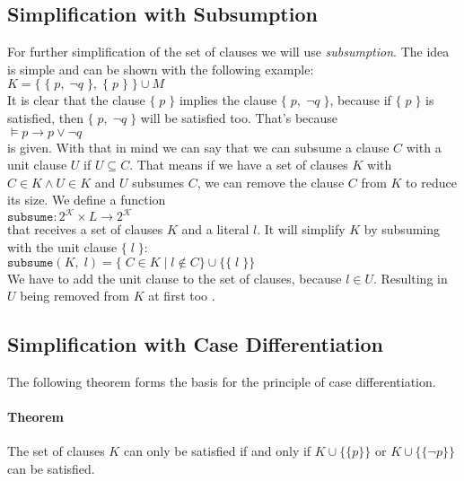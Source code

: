 \subsection{Simplification with Subsumption}
\label{sub:sciDavisPutnamSubsumption}
For further simplification of the set of clauses we will use \emph{subsumption}. The idea is simple and can be shown with the following example:
\\[0.2cm]
\hspace*{1.3cm} $K = \bigl\{\; \{\; p,\; \neg q \;\},\; \{\; p\; \}\;\bigr\} \cup M$
\\[0.2cm]
It is clear that the clause $\{\; p\; \}$ implies the clause $\{\; p,\; \neg q \;\}$, because if $\{\; p\; \}$ is satisfied, then $\{\; p,\; \neg q \;\}$ will be satisfied too. That's because
\\[0.2cm]
\hspace*{1.3cm} $\models p \to p \lor \neg q$
\\[0.2cm]
is given. With that in mind we can say that we can subsume a clause $C$ with a unit clause $U$ if $U \subseteq C$. That means if we have a set of clauses $K$ with $C \in K \land U \in K$ and $U$ subsumes $C$, we can remove the clause $C$ from $K$ to reduce its size. We define a function
\\[0.2cm]
\hspace*{1.3cm} $\texttt{subsume}: 2^{\mathcal{K}} \times L \to 2^{\mathcal{K}}$
\\[0.2cm]
that receives a set of clauses $K$ and a literal $l$. It will simplify $K$ by subsuming with the unit clause $\{\; l\; \}$:
\\[0.2cm]
\hspace*{1.3cm} $\texttt{subsume}(K,\; l) = \{\; C \in K\; |\; l \notin C\} \cup \bigl\{\{\; l\; \bigr\}\}$
\\[0.2cm]
We have to add the unit clause to the set of clauses, because $l \in U$. Resulting in $U$ being removed from $K$ at first too \cite{Stroetman2019}. 

\subsection{Simplification with Case Differentiation}
\label{sub:sciDavisPutnamCaseDiv}
The following theorem forms the basis for the principle of case differentiation.

\paragraph{Theorem}
The set of clauses $K$ can only be satisfied if and only if $K \cup \bigl\{\{p\}\bigr\}$ or $K \cup \bigl\{\{\neg p\}\bigr\}$ can be satisfied.

